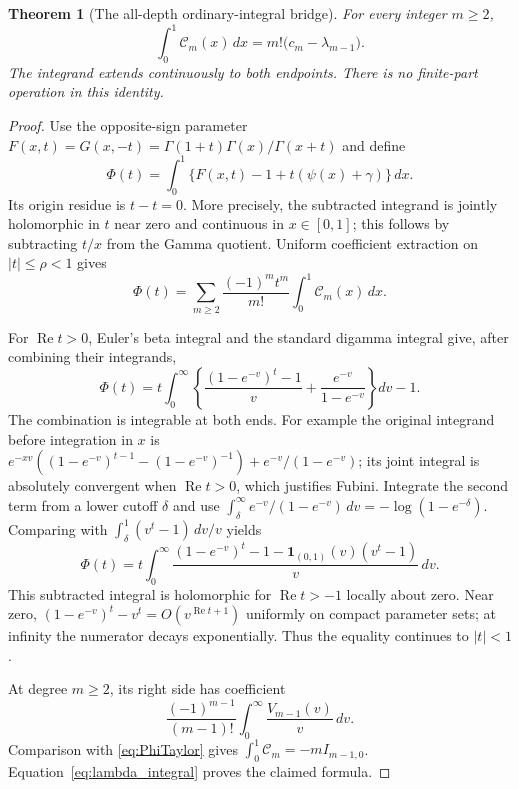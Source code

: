 \documentclass[11pt,a4paper]{article}
\numberwithin{equation}{section}
\newtheorem{theorem}{Theorem}[section]
\theoremstyle{definition}
\newcommand{\CM}{\mathcal C}
\newcommand{\re}{\operatorname{Re}}
\begin{document}
\begin{theorem}[The all-depth ordinary-integral bridge]
\label{thm:Cintegral}
For every integer $m\ge2$,
\begin{equation}\label{eq:Cintegral}
 \boxed{\displaystyle
 \int_0^1\CM_m(x)\,dx=m!\bigl(c_m-\lambda_{m-1}\bigr).}
\end{equation}
The integrand extends continuously to both endpoints. There is no
finite-part operation in this identity.
\end{theorem}
\begin{proof}
Use the opposite-sign parameter
$F(x,t)=G(x,-t)=\Gamma(1+t)\Gamma(x)/\Gamma(x+t)$ and define
\[
 \Phi(t)=\int_0^1\{F(x,t)-1+t(\psi(x)+\gamma)\}\,dx.
\]
Its origin residue is $t-t=0$. More precisely, the subtracted
integrand is jointly holomorphic in $t$ near zero and continuous in
$x\in[0,1]$; this follows by subtracting $t/x$ from the Gamma
quotient. Uniform coefficient extraction on $|t|\le\rho<1$ gives
\begin{equation}\label{eq:PhiTaylor}
 \Phi(t)=\sum_{m\ge2}\frac{(-1)^m t^m}{m!}
                    \int_0^1\CM_m(x)\,dx.
\end{equation}

For $\re t>0$, Euler's beta integral and the standard digamma
integral give, after combining their integrands,
\[
 \Phi(t)=t\int_0^\infty
 \left\{\frac{(1-e^{-v})^t-1}{v}
             +\frac{e^{-v}}{1-e^{-v}}\right\}dv-1.
\]
The combination is integrable at both ends. For example the original
integrand before integration in $x$ is
$e^{-xv}((1-e^{-v})^{t-1}-(1-e^{-v})^{-1})
+e^{-v}/(1-e^{-v})$; its joint integral is absolutely convergent
when $\re t>0$, which justifies Fubini.
Integrate the second term from a lower cutoff $\delta$ and use
$\int_\delta^\infty e^{-v}/(1-e^{-v})\,dv
=-\log(1-e^{-\delta})$. Comparing with
$\int_\delta^1(v^t-1)\,dv/v$ yields
\begin{equation}\label{eq:PhiMellin}
 \Phi(t)=t\int_0^\infty
 \frac{(1-e^{-v})^t-1-\boldsymbol1_{(0,1)}(v)(v^t-1)}v\,dv.
\end{equation}
This subtracted integral is holomorphic for $\re t>-1$ locally
about zero. Near zero, $(1-e^{-v})^t-v^t=O(v^{\re t+1})$
uniformly on compact parameter sets; at infinity the numerator
decays exponentially. Thus the equality continues to $|t|<1$.

At degree $m\ge2$, its right side has coefficient
\[
 \frac{(-1)^{m-1}}{(m-1)!}
             \int_0^\infty\frac{V_{m-1}(v)}v\,dv.
\]
Comparison with \eqref{eq:PhiTaylor} gives
$\int_0^1\CM_m=-m I_{m-1,0}$.
Equation~\eqref{eq:lambda_integral} proves the claimed formula.
\end{proof}
\end{document}
